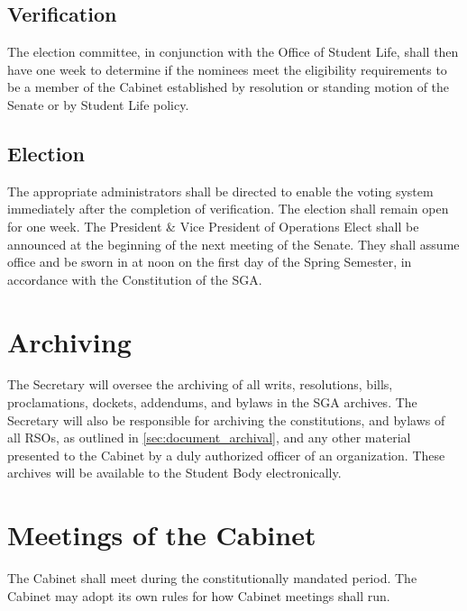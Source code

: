 \documentclass[12pt]{scrreprt}
\begin{document}
\subsection{Verification}
The election committee, in conjunction with the Office of Student Life, shall 
then have one week to determine if the nominees meet the eligibility 
requirements to be a member of the Cabinet established by resolution or 
standing motion of the Senate or by Student Life policy. 

\subsection{Election}
The appropriate administrators shall be directed to enable the voting system 
immediately after the completion of verification. The election shall remain 
open for one week. The President \& Vice President of Operations Elect shall be announced at 
the beginning of the next meeting of the Senate. They shall assume office and 
be sworn in at noon on the first day of the Spring Semester, in accordance 
with the Constitution of the SGA. 

\section{Archiving}
The Secretary will oversee the archiving of all writs, resolutions, bills, 
proclamations, dockets, addendums, and bylaws in the SGA archives. The Secretary will also be 
responsible for archiving the constitutions, and bylaws of all RSOs, as 
outlined in \ref{sec:document_archival}, and any other material presented to 
the Cabinet by a duly authorized officer of an organization. These archives 
will be available to the Student Body electronically.

\section{Meetings of the Cabinet}
The Cabinet shall meet during the constitutionally mandated period. The 
Cabinet may adopt its own rules for how Cabinet meetings shall run.
\end{document}
